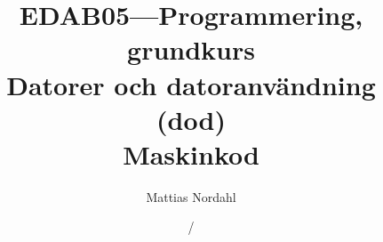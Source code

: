 \documentclass[handout]{beamer}
\author[]{Mattias Nordahl}
\institute{\url{mattias.nordahl@cs.lth.se}}
\date{}
\begin{document}
 

\title{{\small\bf EDAB05---Programmering, grundkurs}\\Datorer och datoranvändning (dod)\\Maskinkod} 

\frame[plain]{
\maketitle

\vspace{-2\baselineskip}
}

\date{\the\year/\the\numexpr{}} 


\end{document}
